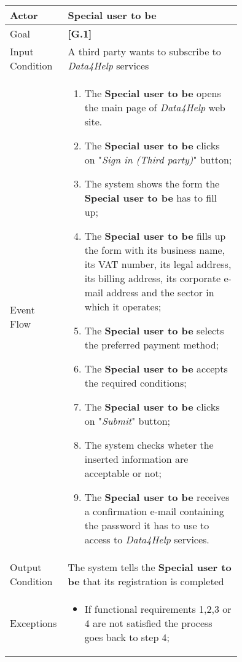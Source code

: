 \begin{center}
\begin{table}
\begin{tabular}{ | l | p{0.75\linewidth} | }
  \hline
    Actor & \textbf{Special user to be} \\ \hline
    Goal & \textbf{[G.1]} \\ \hline
    Input Condition & A third party wants to subscribe to  \textit{Data4Help} services \\ \hline
    Event Flow & \begin{minipage}[t]{0.7\textwidth}
      \begin{enumerate}
        \item The \textbf{Special user to be} opens the main page of \textit{Data4Help} web site.
        \item The \textbf{Special user to be} clicks on "\textit{Sign in (Third party)}" button;
        \item The system shows the form the \textbf{Special user to be} has to fill up;
        \item The \textbf{Special user to be} fills up the form with its business name, its VAT number, its legal address, its billing address, its corporate e-mail address and the sector in which it operates;
        \item The \textbf{Special user to be} selects the preferred payment method;
        \item The \textbf{Special user to be} accepts the required conditions;
        \item The \textbf{Special user to be} clicks on "\textit{Submit}" button;
        \item The system checks wheter the inserted information are acceptable or not;
        \item The \textbf{Special user to be} receives a confirmation e-mail containing the password it has to use to access to \textit{Data4Help} services.
      \end{enumerate}
    \smallskip
  \end{minipage} \\ \hline
  Output Condition & The system tells the \textbf{Special user to be} that its registration is completed \\ \hline
  Exceptions & \begin{minipage}[t]{0.7\textwidth}
    \begin{itemize}
      \smallskip
      \item If functional requirements 1,2,3 or 4 are not satisfied the process goes back to step 4;

\end{itemize}
\end{minipage}
\end{tabular}
\end{table}
\end{center}
